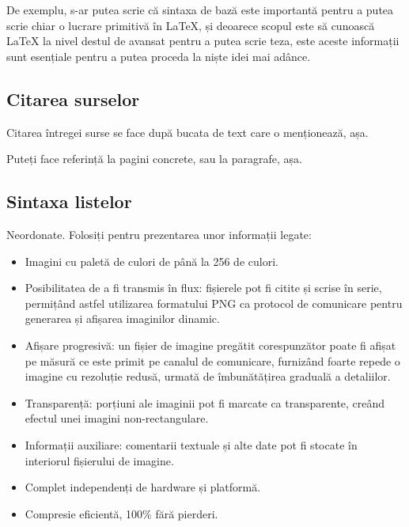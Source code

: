 \documentclass[a4paper,12pt]{report}
\begin{document}
De exemplu, s-ar putea scrie că sintaxa de bază este importantă
pentru a putea scrie chiar o lucrare primitivă în \LaTeX{}, și deoarece
scopul este să cunoască \LaTeX{} la nivel destul de avansat pentru a putea
scrie teza, este aceste informații sunt esențiale pentru a putea proceda la
niște idei mai adânce.

\subsection{Citarea surselor}

Citarea întregei surse se face după bucata de text care o menționează, așa\cite{gif_unusable_reason}.

Puteți face referință la pagini concrete, sau la paragrafe, așa\cite[12.2.]{png_spec}.

\subsection{Sintaxa listelor}

Neordonate. Folosiți pentru prezentarea unor informații legate:

\begin{itemize}
    \item
        Imagini cu paletă de culori de până la 256 de culori.
        
    \item
        Posibilitatea de a fi transmis în flux:
        fișierele pot fi citite și scrise în serie, permițând astfel utilizarea formatului
        PNG ca protocol de comunicare pentru generarea și afișarea imaginilor dinamic.

    \item
        Afișare progresivă: un fișier de imagine pregătit corespunzător poate fi
        afișat pe măsură ce este primit pe canalul de comunicare,
        furnizând foarte repede o imagine cu rezoluție redusă,
        urmată de îmbunătățirea graduală a detaliilor.

    \item
        Transparență: porțiuni ale imaginii pot fi marcate ca transparente,
        creând efectul unei imagini non-rectangulare.

    \item 
        Informații auxiliare: comentarii textuale și alte date pot fi
        stocate în interiorul fișierului de imagine.

    \item
        Complet independenți de hardware și platformă.

    \item
        Compresie eficientă, 100\% fără pierderi.
\end{itemize}
\end{document}
